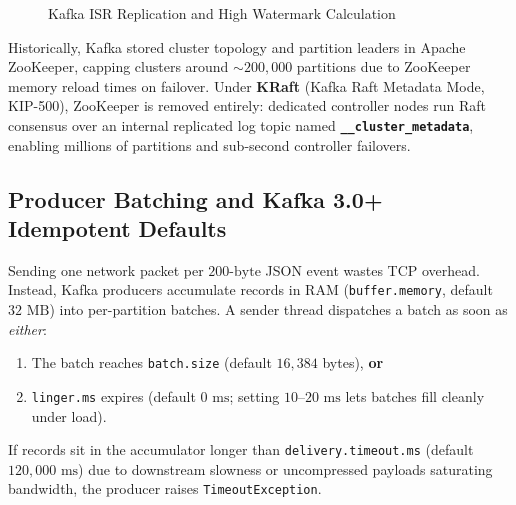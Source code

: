 \begin{figure}[htbp]
\centering
{}
\caption{Kafka ISR Replication and High Watermark Calculation}
\label{fig:v4-ch05-kafka-hw}
\end{figure}

Historically, Kafka stored cluster topology and partition leaders in Apache ZooKeeper, capping clusters around $\sim 200{,}000$ partitions due to ZooKeeper memory reload times on failover. Under \textbf{KRaft} (Kafka Raft Metadata Mode, KIP-500), ZooKeeper is removed entirely: dedicated controller nodes run Raft consensus over an internal replicated log topic named \textbf{\texttt{\_\_cluster\_metadata}}, enabling millions of partitions and sub-second controller failovers.

\subsection{Producer Batching and Kafka 3.0+ Idempotent Defaults}

Sending one network packet per $200\text{-byte}$ JSON event wastes TCP overhead. Instead, Kafka producers accumulate records in RAM (\texttt{buffer.memory}, default $32\text{ MB}$) into per-partition batches. A sender thread dispatches a batch as soon as \emph{either}:
\begin{enumerate}[leftmargin=18pt]
  \item The batch reaches \texttt{batch.size} (default $16{,}384$ bytes), \textbf{or}
  \item \texttt{linger.ms} expires (default $0\text{ ms}$; setting $10\text{--}20\text{ ms}$ lets batches fill cleanly under load).
\end{enumerate}
If records sit in the accumulator longer than \texttt{delivery.timeout.ms} (default $120{,}000\text{ ms}$) due to downstream slowness or uncompressed payloads saturating bandwidth, the producer raises \texttt{TimeoutException}.

